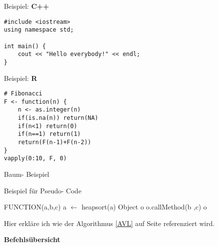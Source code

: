 \documentclass{uni_tue_template}
\begin{document}
Beispiel: \textbf{C++}

\begin{lstlisting}[style=cpp]
#include <iostream>
using namespace std;

int main() {
	cout << "Hello everybody!" << endl;
}
\end{lstlisting}

Beispiel: \textbf{R}

\begin{lstlisting}[style=R]
# Fibonacci
F <- function(n) {
    n <- as.integer(n)
    if(is.na(n)) return(NA)
    if(n<1) return(0)
    if(n==1) return(1)
    return(F(n-1)+F(n-2))
}
vapply(0:10, F, 0)
\end{lstlisting}

\newpage

\begin{center}
{\Large Baum- Beispiel}

\end{center}

{\Large Beispiel für Pseudo- Code}
\begin{algorithm}
\textsc{FUNCTION}(a,b,c)\;
a $\leftarrow$ heapsort(a)\;
Object o\;
o.callMethod(b ,c)\;
\Return o
\caption{Beispiel Pseudo- Algorithmus}
\label{AVL}
\end{algorithm}

Hier erkläre ich wie der Algorithmus \ref{AVL} auf Seite \pageref{AVL} referenziert wird.
\newpage

\vspace{5mm}
\textbf{Befehlsübersicht}
\end{document}
